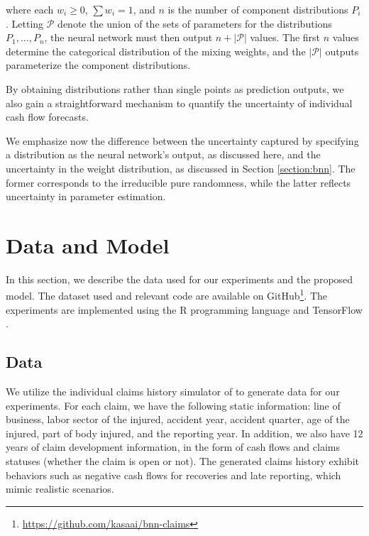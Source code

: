 \documentclass{article}
\begin{document}
where each $w_i \geq 0$, $\sum w_i = 1$, and $n$ is the number of component distributions $P_i$. Letting $\mathcal{P}$ denote the union of the sets of parameters for the distributions $P_1, \dots, P_n$, the neural network must then output $n + |\mathcal{P}|$ values. The first $n$ values determine the categorical distribution of the mixing weights, and the $|\mathcal{P}|$ outputs parameterize the component distributions.

By obtaining distributions rather than single points as prediction outputs, we also gain a straightforward mechanism to quantify the uncertainty of individual cash flow forecasts.

We emphasize now the difference between the uncertainty captured by specifying a distribution as the neural network's output, as discussed here, and the uncertainty in the weight distribution, as discussed in Section \ref{section:bnn}. The former corresponds to the irreducible pure randomness, while the latter reflects uncertainty in parameter estimation.

\section{Data and Model}

In this section, we describe the data used for our experiments and the proposed model. The dataset used and relevant code are available on GitHub\footnote{\url{https://github.com/kasaai/bnn-claims}}. The experiments are implemented using the R programming language \cite{rdevelopmentcoreteamLanguageEnvironment2011} and TensorFlow \cite{abadiTensorflowSystem2016}.

\subsection{Data}

We utilize the individual claims history simulator of \cite{gabrielliIndividualClaims2018} to generate data for our experiments. For each claim, we have the following static information: line of business, labor sector of the injured, accident year, accident quarter, age of the injured, part of body injured, and the reporting year. In addition, we also have 12 years of claim development information, in the form of cash flows and claims statuses (whether the claim is open or not). The generated claims history exhibit behaviors such as negative cash flows for recoveries and late reporting, which mimic realistic scenarios.
\end{document}
